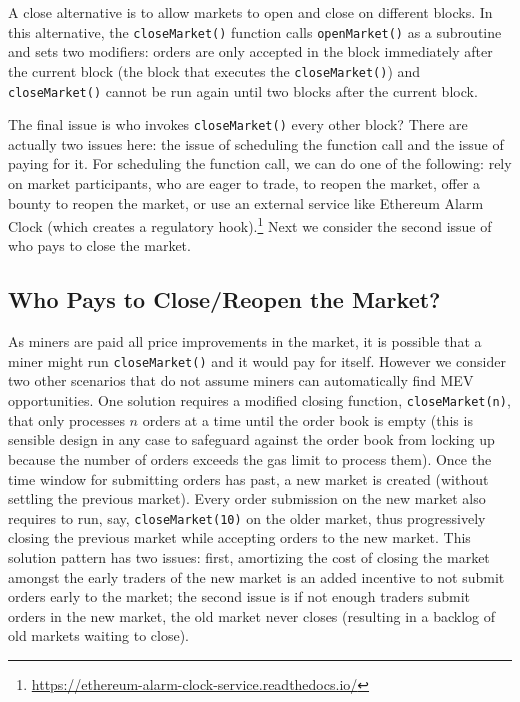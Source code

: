 
A close alternative is to allow markets to open and close on different blocks. In this alternative, the \texttt{closeMarket()} function calls \texttt{openMarket()} as a subroutine and sets two modifiers: orders are only accepted in the block immediately after the current block (\ie the block that executes the \texttt{closeMarket()}) and \texttt{closeMarket()} cannot be run again until two blocks after the current block. 

The final issue is who invokes \texttt{closeMarket()} every other block? There are actually two issues here: the issue of scheduling the function call and the issue of paying for it. For scheduling the function call, we can do one of the following: rely on market participants, who are eager to trade, to reopen the market, offer a bounty to reopen the market, or use an external service like Ethereum Alarm Clock (which creates a regulatory hook).\footnote{\url{https://ethereum-alarm-clock-service.readthedocs.io/}} Next we consider the second issue of who pays to close the market. 


\subsection{Who Pays to Close/Reopen the Market?}
\label{sec:close}

As miners are paid all price improvements in the market, it is possible that a miner might run \texttt{closeMarket()} and it would pay for itself. However we consider two other scenarios that do not assume miners can automatically find MEV opportunities. One solution requires a modified closing function, \texttt{closeMarket(n)}, that only processes $n$ orders at a time until the order book is empty (this is sensible design in any case to safeguard against the order book from locking up because the number of orders exceeds the gas limit to process them).  Once the time window for submitting orders has past, a new market is created (without settling the previous market). Every order submission on the new market also requires to run, say, \texttt{closeMarket(10)} on the older market, thus progressively closing the previous market while accepting orders to the new market. This solution pattern has two issues: first, amortizing the cost of closing the market amongst the early traders of the new market is an added incentive to not submit orders early to the market; the second issue is if not enough traders submit orders in the new market, the old market never closes (resulting in a backlog of old markets waiting to close).

